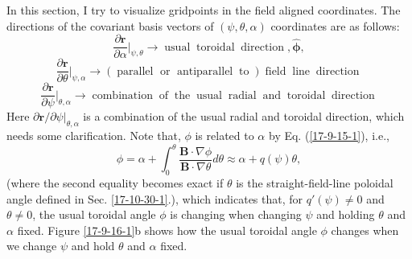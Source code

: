 \documentclass{llncs}
\newcommand{\infixor}{\text{ or }}
\newcommand{\nobracket}{}
\newcommand{\tmmathbf}[1]{\ensuremath{\boldsymbol{#1}}}
\newcommand{\tmop}[1]{\ensuremath{\operatorname{#1}}}
\begin{document}
In this section, I try to visualize gridpoints in the field aligned
coordinates. The directions of the covariant basis vectors of $(\psi, \theta,
\alpha)$ coordinates are as follows:
\begin{equation}
  \frac{\partial \mathbf{r}}{\partial \alpha} |_{\psi, \theta} \nobracket
  \longrightarrow \tmop{usual} \tmop{toroidal} \tmop{direction},
  \hat{\tmmathbf{\phi}},
\end{equation}
\begin{equation}
  \frac{\partial \mathbf{r}}{\partial \theta} |_{\psi, \alpha} \nobracket
  \longrightarrow \left( \tmop{parallel} \infixor \tmop{antiparallel}
  \tmop{to} \right) \tmop{field} \tmop{line} \tmop{direction}
\end{equation}
\begin{equation}
  \frac{\partial \mathbf{r}}{\partial \psi} |_{\theta, \alpha} \nobracket
  \longrightarrow \tmop{combination} \tmop{of} \tmop{the} \tmop{usual}
  \tmop{radial} \tmop{and} \tmop{toroidal} \tmop{direction}
\end{equation}
Here $\partial \mathbf{r}/ \partial \psi |_{\theta, \alpha} \nobracket$ is a
combination of the usual radial and toroidal direction, which needs some
clarification. Note that, $\phi$ is related to $\alpha$ by Eq.
(\ref{17-9-15-1}), i.e.,
\begin{equation}
  \label{17-10-30-2} \phi = \alpha + \int_0^{\theta} \frac{\mathbf{B} \cdot
  \nabla \phi}{\mathbf{B} \cdot \nabla \theta} d \theta \approx \alpha + q
  (\psi) \theta,
\end{equation}
(where the second equality becomes exact if $\theta$ is the
straight-field-line poloidal angle defined in Sec. \ref{17-10-30-1}.), which
indicates that, for $q' (\psi) \neq 0$ and $\theta \neq 0$, the usual toroidal
angle $\phi$ is changing when changing $\psi$ and holding $\theta$ and
$\alpha$ fixed. Figure \ref{17-9-16-1}b shows how the usual toroidal angle
$\phi$ changes when we change $\psi$ and hold $\theta$ and $\alpha$ fixed.
\end{document}
